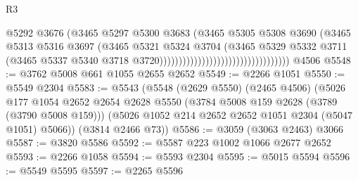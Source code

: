 \begin{lexlean}{R3}
\begin{coremodule}
                                                            @5292
                                                            @3676
                                                            (@3465
                                                              @5297
                                                              @5300
                                                              @3683
                                                              (@3465
                                                                @5305
                                                                @5308
                                                                @3690
                                                                (@3465
                                                                  @5313
                                                                  @5316
                                                                  @3697
                                                                  (@3465
                                                                    @5321
                                                                    @5324
                                                                    @3704
                                                                    (@3465
                                                                      @5329
                                                                      @5332
                                                                      @3711
                                                                      (@3465
                                                                        @5337
                                                                        @5340
                                                                        @3718
                                                                        @3720))))))))))))))))))))))))))))))))))
    @4506
@5548 := @3762 @5008 @661 @1055 @2655 @2652
@5549 := @2266 @1051
@5550 := @5549 @2304
@5583 := @5543
    (@5548
      (@2629 @5550)
      (@2465 @4506)
      (@5026
        @177
        @1054
        @2652
        @2654
        @2628
        @5550
        (@3784 @5008 @159 @2628 (@3789 (@3790 @5008 @159)))
        (@5026 @1052 @214 @2652 @2652 @1051 @2304 (@5047 @1051) @5066))
      (@3814 @2466 @73))
@5586 := @3059 (@3063 @2463) @3066
@5587 := @3820 @5586
@5592 := @5587 @223 @1002 @1066 @2677 @2652
@5593 := @2266 @1058
@5594 := @5593 @2304
@5595 := @5015 @5594
@5596 := @5549 @5595
@5597 := @2265 @5596

\end{coremodule}
\end{lexlean}
